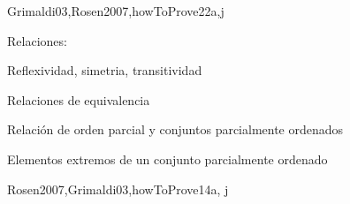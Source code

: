 \begin{syllabus}
\begin{unit}{\DSSetsRelationsandFunctions}{}{Grimaldi03,Rosen2007,howToProve}{22}{a,j}
   \begin{topics}
        \item \DSSetsRelationsandFunctionsTopicSets
        \item Relaciones:
        \begin{subtopics}
            \item Reflexividad, simetria, transitividad
            \item Relaciones de equivalencia
            \item Relación de orden parcial y conjuntos parcialmente ordenados
            \item Elementos extremos de un conjunto parcialmente ordenado
        \end{subtopics}
        \item \DSSetsRelationsandFunctionsTopicFunctions
   \end{topics}
   \begin{learningoutcomes}
	\item \DSSetsRelationsandFunctionsLOExplainWith [\Assessment]
	\item \DSSetsRelationsandFunctionsLOPerformThe [\Assessment]
	\item \DSSetsRelationsandFunctionsLORelate [\Assessment]
   \end{learningoutcomes}
 \end{unit}

 \begin{unit}{\DSBasicLogic}{}{Rosen2007,Grimaldi03,howToProve}{14}{a, j}
   \begin{topics}
        \item \DSBasicLogicTopicPropositional%
        \item \DSBasicLogicTopicLogical%
        \item \DSBasicLogicTopicTruth%
        \item \DSBasicLogicTopicNormal%
        \item \DSBasicLogicTopicValidity%
        \item \DSBasicLogicTopicPropositionalInference%
        \item \DSBasicLogicTopicPredicate%
        \item \DSBasicLogicTopicLimitations%
   \end{topics}
   \begin{learningoutcomes}
	\item \DSBasicLogicLOConvertLogical [\Usage ]
	\item \DSBasicLogicLOApplyFormal [\Usage ]
	\item \DSBasicLogicLOUseThe [\Usage]
	\item \DSBasicLogicLODescribeHowCan [\Familiarity]
	\item \DSBasicLogicLOApplyFormalAnd [\Usage ]
	\item \DSBasicLogicLODescribeTheLimitationsAnd [\Usage]
   \end{learningoutcomes}
 \end{unit}


\end{syllabus}
